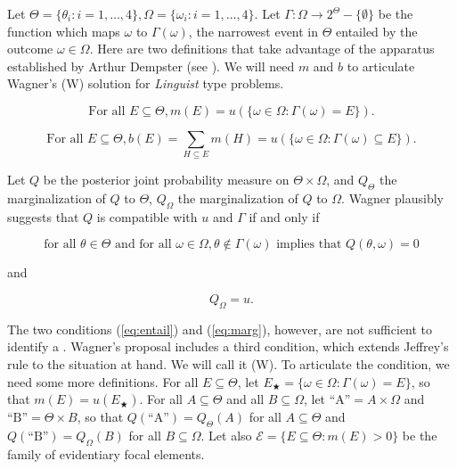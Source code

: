 Let
$\Theta=\{\theta_{i}:i=1,\ldots,4\},\Omega=\{\omega_{i}:i=1,\ldots,4\}$.
Let $\Gamma:\Omega\rightarrow{}2^{\Theta}-\{\emptyset\}$ be the
function which maps $\omega$ to $\Gamma(\omega)$, the narrowest event
in $\Theta$ entailed by the outcome $\omega\in\Omega$. Here are two
definitions that take advantage of the apparatus established by Arthur
Dempster (see ). We will need $m$ and $b$ to
articulate Wagner's (W) solution for \emph{Linguist} type problems.

\begin{equation}
  \mbox{For all }E\subseteq{}\Theta, m(E)=u(\{\omega\in\Omega:\Gamma(\omega)=E\})\label{eq:mof}.
\end{equation}

\begin{equation}
  \mbox{For all }E\subseteq{}\Theta, b(E)=\sum_{H\subseteq{}E}m(H)=u(\{\omega\in\Omega:\Gamma(\omega)\subseteq{}E\})\label{eq:bof}.
\end{equation}

Let $Q$ be the posterior joint probability measure on
$\Theta\times\Omega$, and $Q_{\Theta}$ the marginalization of $Q$ to
$\Theta$, $Q_{\Omega}$ the marginalization of $Q$ to $\Omega$.
Wagner plausibly suggests that $Q$ is compatible with $u$ and $\Gamma$
if and only if

\begin{equation}
  \label{eq:entail}
  \mbox{for all }\theta\in\Theta\mbox{ and for all
  }\omega\in\Omega,\theta\notin\Gamma(\omega)\mbox{ implies that }Q(\theta,\omega)=0
\end{equation}

and

\begin{equation}
  \label{eq:marg}
  Q_{\Omega}=u.
\end{equation}

The two conditions (\ref{eq:entail}) and (\ref{eq:marg}), however, are
not sufficient to identify a  . Wagner's proposal includes a third
condition, which extends Jeffrey's rule to the situation at hand. We
will call it (W). To articulate the condition, we need some more
definitions. For all $E\subseteq{}\Theta$, let
$E_{\bigstar}=\{\omega\in\Omega:\Gamma(\omega)=E\}$, so that
$m(E)=u(E_{\bigstar})$. For all $A\subseteq\Theta$ and all
$B\subseteq\Omega$, let $\mbox{``A''}=A\times\Omega$ and
$\mbox{``B''}=\Theta\times{}B$, so that
$Q(\mbox{``A''})=Q_{\Theta}(A)$ for all $A\subseteq\Theta$ and
$Q(\mbox{``B''})=Q_{\Omega}(B)$ for all $B\subseteq\Omega$. Let also
$\mathcal{E}=\{E\subseteq\Theta:m(E)>0\}$ be the family of evidentiary
focal elements.

